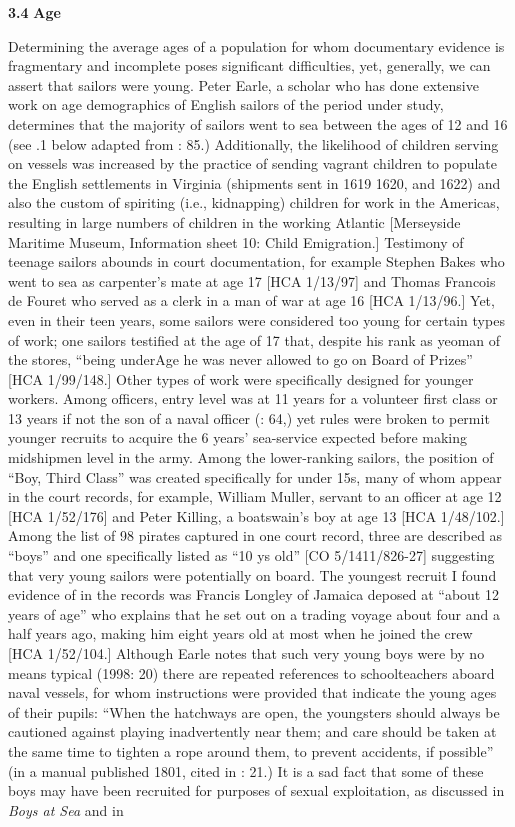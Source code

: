 \textbf{3.4} \textbf{Age}

  Determining the average ages of a population for whom documentary evidence is fragmentary and incomplete poses significant difficulties, yet, generally, we can assert that sailors were young. Peter Earle, a scholar who has done extensive work on age demographics of English sailors of the period under study, determines that the majority of sailors went to sea between the ages of 12 and 16 (see .1 below adapted from \citealt{Earle1993}: 85.) Additionally, the likelihood of children serving on vessels was increased by the practice of sending vagrant children to populate the English settlements in Virginia (shipments sent in 1619 1620, and 1622) and also the custom of spiriting (i.e., kidnapping) children for work in the Americas, resulting in large numbers of children in the working Atlantic [Merseyside Maritime Museum, Information sheet 10: Child Emigration.] Testimony of teenage sailors abounds in court documentation, for example Stephen Bakes who went to sea as carpenter’s mate at age 17 [HCA 1/13/97] and Thomas Francois de Fouret who served as a clerk in a man of war at age 16 [HCA 1/13/96.] Yet, even in their teen years, some sailors were considered too young for certain types of work; one sailors testified at the age of 17 that, despite his rank as yeoman of the stores, “being underAge he was never allowed to go on Board of Prizes” [HCA 1/99/148.] Other types of work were specifically designed for younger workers. Among officers, entry level was at 11 years for a volunteer first class or 13 years if not the son of a naval officer (\citealt{AdkinsAdkins2008}: 64,) yet rules were broken to permit younger recruits to acquire the 6 years’ sea-service expected before making midshipmen level in the army. Among the lower-ranking sailors, the position of “Boy, Third Class” was created specifically for under 15s, many of whom appear in the court records, for example, William Muller, servant to an officer at age 12 [HCA 1/52/176] and Peter Killing, a boatswain's boy at age 13 [HCA 1/48/102.] Among the list of 98 pirates captured in one court record, three are described as “boys” and one specifically listed as “10 ys old” [CO 5/1411/826-27] suggesting that very young sailors were potentially on board. The youngest recruit I found evidence of in the records was Francis Longley of Jamaica deposed at “about 12 years of age” who explains that he set out on a trading voyage about four and a half years ago, making him eight years old at most when he joined the crew [HCA 1/52/104.] Although Earle notes that such very young boys were by no means typical (1998: 20) there are repeated references to schoolteachers aboard naval vessels, for whom instructions were provided that indicate the young ages of their pupils: “When the hatchways are open, the youngsters should always be cautioned against playing inadvertently near them; and care should be taken at the same time to tighten a rope around them, to prevent accidents, if possible” (in a manual published 1801, cited in \citealt{AdkinsAdkins2008}: 21.) It is a sad fact that some of these boys may have been recruited for purposes of sexual exploitation, as discussed in  \textit{Boys at Sea} and in  